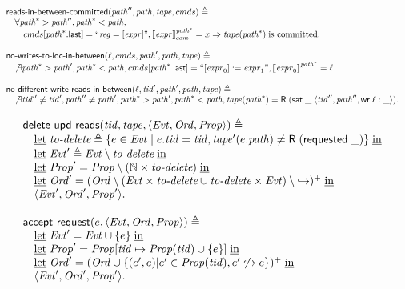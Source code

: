 {\[
\begin{array}{l}
\readsBetweenCommitted(\cpath'', \cpath, \tape, \Carm) \triangleq \\
\quad \forall \cpath^{*} > \cpath'', \cpath^{*} < \cpath, \\
\quad \quad \Carm[\lastInstr{\cpath^{*}}] = ``\reg = [\expr]", |[\expr|] ^{\cpath^{*}} _{com} = x =>
            \tape(\cpath^{*}) \; \text{is committed}. \\
\\
\noWritesBetween(\loc, \Carm, \cpath', \cpath, \tape) \triangleq \\
\quad \not \exists \cpath^{*} > \cpath', \cpath^{*} < \cpath, \Carm[\lastInstr{\cpath^{*}}] = ``[\expr_0] := \expr_1",
      |[\expr_0|]^{\cpath^{*}} = \loc.\\
\\
\noDiffReadsBetween(\loc, \tId', \cpath', \cpath, \tape) \triangleq \\
\quad \not \exists \tId'' \not = \tId', \cpath'' \not = \cpath', \cpath^{*} > \cpath', \cpath^{*} < \cpath,
      \tape(\cpath^{*}) = \tapeRead{(\tapeSatisfied{\_}{\stRequestWrite{\tId''}{ \cpath''}{\loc}{\_}})}. \\
\end{array}
\]

\[
\begin{array}{l}
\textup{\sf delete-upd-reads}(\mathit{tid}, \mathit{tape}, \langle \mathit{Evt}, \mathit{Ord}, \mathit{Prop} \rangle) \triangleq \\
\quad \text{\underline{let}} \; \textit{to-delete} \triangleq
\{ e \in \mathit{Evt} \mid e.\mathit{tid} = \mathit{tid}, \mathit{tape}'(e.\mathit{path}) \not = \textsf{R} \; (\mathsf{requested} \; \_) \} \; \text{\underline{in}} \\
\quad \text{\underline{let}} \; \mathit{Evt}' \triangleq \mathit{Evt} \setminus \textit{to-delete} \; \text{\underline{in}} \\
\quad \text{\underline{let}} \; \mathit{Prop}' = \mathit{Prop} \setminus (\mathbb{N} \times \textit{to-delete}) \; \text{\underline{in}} \\
\quad \text{\underline{let}} \; \mathit{Ord}'  = (\mathit{Ord} \setminus (\mathit{Evt} \times \textit{to-delete} \cup \textit{to-delete} \times \mathit{Evt}) \setminus { \hookrightarrow })^{+}
 \; \text{\underline{in}} \\
\quad \langle \mathit{Evt}', \mathit{Ord}', \mathit{Prop}' \rangle. \\
\\
\textup{\sf accept-request}(e, \langle \mathit{Evt}, \mathit{Ord}, \mathit{Prop} \rangle) \triangleq \\
\quad \text{\underline{let}} \; \mathit{Evt}' = \mathit{Evt} \cup \{ e \} \; \text{\underline{in}} \\
\quad \text{\underline{let}} \; \mathit{Prop}' = \mathit{Prop}[\mathit{tid} \mapsto \mathit{Prop}(\mathit{tid}) \cup \{ e \}]  \; \text{\underline{in}} \\
\quad \text{\underline{let}} \; \mathit{Ord}'  = (\mathit{Ord} \cup \{(e', e) | e' \in \mathit{Prop}(\mathit{tid}), e' \not \hookrightarrow e \})^{+} \; \text{\underline{in}} \\
\quad \langle \mathit{Evt}', \mathit{Ord}', \mathit{Prop}' \rangle.
\end{array}
\]

}
